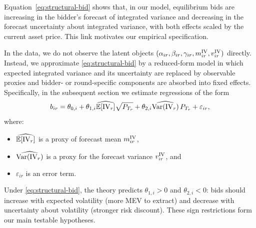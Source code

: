 Equation~\eqref{eq:structural-bid} shows that, in our model, equilibrium bids are increasing in the bidder's forecast of integrated variance and decreasing in the forecast uncertainty about integrated variance, with both effects scaled by the current asset price. This link motivates our empirical specification.

In the data, we do not observe the latent objects $(\alpha_{ir}, \beta_{ir}, \gamma_{ir}, m^{\mathrm{IV}}_{ir}, v^{\mathrm{IV}}_{ir})$ directly. Instead, we approximate \eqref{eq:structural-bid} by a reduced-form model in which expected integrated variance and its uncertainty are replaced by observable proxies and bidder- or round-specific components are absorbed into fixed effects. Specifically, in the subsequent section we estimate regressions of the form
\begin{equation}\label{eq:reduced-form}
  b_{ir}
  = \theta_{0,i}
    + \theta_{1,i} \widehat{\mathbb{E} [\mathrm{IV}_r]} \sqrt{P_{T_r}}
    + \theta_{2,i} \widehat{\mathrm{Var} (\mathrm{IV}_r)} \, P_{T_r}
    + \varepsilon_{ir},
\end{equation}
where:
\begin{itemize}
  \item $\widehat{\mathbb{E} [\mathrm{IV}_r]}$ is a proxy of forecast mean $m^{\mathrm{IV}}_{ir}$,
  \item $\widehat{\mathrm{Var} (\mathrm{IV}_r)}$ is a proxy for the forecast variance
        $v^{\mathrm{IV}}_{ir}$, and
  \item $\varepsilon_{ir}$ is an error term.
\end{itemize}
Under \eqref{eq:structural-bid}, the theory predicts $\theta_{1,i} > 0$ and $\theta_{2,i} < 0$: bids should increase with expected volatility (more MEV to extract) and decrease with uncertainty about volatility (stronger risk discount). These sign restrictions form our main testable hypotheses.
